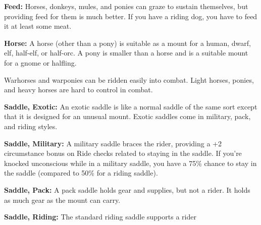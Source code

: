 \textbf{Feed:} Horses, donkeys, mules, and ponies can graze to sustain themselves, 
but providing feed for them is much better. If you have a riding dog, you have 
to feed it at least some meat.

\textbf{Horse:} A horse (other than a pony) is suitable as a mount for a human, 
dwarf, elf, half-elf, or half-orc. A pony is smaller than a horse and is a suitable 
mount for a gnome or halfling.

Warhorses and warponies can be ridden easily into combat. Light horses, ponies, 
and heavy horses are hard to control in combat.

\textbf{Saddle, Exotic:} An exotic saddle is like a normal saddle of the same sort 
except that it is designed for an unusual mount. Exotic saddles come in military, 
pack, and riding styles.

\textbf{Saddle, Military:} A military saddle braces the rider, providing a +2 circumstance 
bonus on Ride checks related to staying in the saddle. If you're knocked unconscious 
while in a military saddle, you have a 75\% chance to stay in the saddle (compared 
to 50\% for a riding saddle).

\textbf{Saddle, Pack:} A pack saddle holds gear and supplies, but not a rider. 
It holds as much gear as the mount can carry.

\textbf{Saddle, Riding:} The standard riding saddle supports a rider